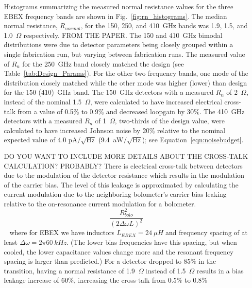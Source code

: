 Histograms summarizing the measured normal resistance values for the three \ac{EBEX} frequency bands are shown in Fig.~\ref{fig:rn_histograms}. 
The median normal resistance, $R_{normal}$, for the 150, 250, and 410~GHz bands was 1.9, 1.5, and 1.0~$\Omega$ respectively. 
FROM THE PAPER.
The 150 and 410~GHz bimodal distributions were due to detector parameters being closely grouped within a single fabrication run, but varying between fabrication runs. 
The measured value of $R_{n}$ for the 250~GHz band closely matched the design (see 
Table~\ref{tab:Design_Params}). 
For the other two frequency bands, one mode of the distribution closely matched while the other mode was higher (lower) than design for the 150 (410)~GHz band. 
The 150~GHz detectors with a measured $R_{n}$ of 2~$\Omega$, instead of the nominal 1.5~$\Omega$, were calculated to have increased electrical cross-talk from a value of 0.5\% to 0.9\% and decreased loopgain by 30\%. 
The 410~GHz detectors with a measured $R_{n}$ of 1~$\Omega$, two-thirds of the design value, were calculated to have increased Johnson noise by 20\% relative to the nominal expected value of 4.0 pA$/\sqrt{\mathrm{Hz}}$ (9.4~aW$/\sqrt{\mathrm{Hz}}$); see Equation~\ref{eqn:noisebudget}.

DO YOU WANT TO INCLUDE MORE DETAILS ABOUT THE CROSS-TALK CALCULATION? PROBABLY? 
There is electrical cross-talk between detectors due to the modulation of the detector resistance which results in the modulation of the carrier bias. 
The level of this leakage is approximated by calculating the current modulation due to the neighboring bolometer's carrier bias leaking relative to the on-resonance current modulation for a bolometer. 
\begin{equation}
\frac{R_{bolo}^2}{(2\Delta \omega L)^2}
\end{equation}
~\citep{Dobbs2011}
where for \ac{EBEX} we have inductors $L_{EBEX} = 24~\mu H$ and frequency spacing of at least $\Delta \omega = 2\pi 60~kHz$. 
(The lower bias frequencies have this spacing, but when cooled, the lower capacitance values change more and the resonant frequency spacing is larger than predicted.)
For a detector dropped to 85\% in the transition, having a normal resistance of 1.9~$\Omega$ instead of 1.5~$\Omega$ results in a bias leakage increase of 60\%, increasing the cross-talk from 0.5\% to 0.8\%

